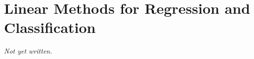 \chapter{Linear Methods for Regression and Classification}\label{ch:linear-methods-ml}


\textit{Not yet written.}
